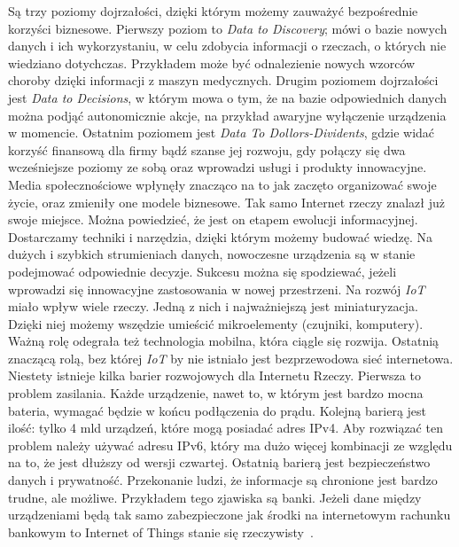 \documentclass[brudnopis]{xmgr}
\begin{document}
Są trzy poziomy dojrzałości, dzięki którym możemy zauważyć bezpośrednie korzyści biznesowe.
Pierwszy poziom to \emph{Data to Discovery}; mówi o bazie nowych danych i ich wykorzystaniu, w celu zdobycia informacji o rzeczach, o których nie wiedziano dotychczas. Przykładem może być odnalezienie nowych wzorców choroby dzięki informacji z maszyn medycznych. 
Drugim poziomem dojrzałości jest \emph{Data to Decisions}, w którym mowa o tym, że na bazie odpowiednich danych można podjąć autonomicznie akcje, na przykład awaryjne wyłączenie urządzenia w momencie.
Ostatnim poziomem jest \emph{Data To Dollors-Dividents}, gdzie widać korzyść finansową dla firmy bądź szanse jej rozwoju, gdy połączy się dwa wcześniejsze poziomy ze sobą oraz wprowadzi usługi i produkty innowacyjne. 
Media społecznościowe wpłynęły znacząco na to jak zaczęto organizować swoje życie, oraz zmieniły one modele biznesowe. Tak samo Internet rzeczy znalazł już swoje miejsce. Można powiedzieć, że jest on etapem ewolucji informacyjnej. Dostarczamy techniki i narzędzia, dzięki którym możemy budować wiedzę. Na dużych i szybkich strumieniach danych, nowoczesne urządzenia są w stanie podejmować odpowiednie decyzje. Sukcesu można się spodziewać, jeżeli wprowadzi się innowacyjne zastosowania w nowej przestrzeni. 
Na rozwój \emph{IoT} miało wpływ wiele rzeczy. Jedną z nich i najważniejszą jest miniaturyzacja. Dzięki niej możemy wszędzie umieścić mikroelementy (czujniki, komputery). Ważną rolę odegrała też technologia mobilna, która ciągle się rozwija. Ostatnią znaczącą rolą, bez której \emph{IoT} by nie istniało jest bezprzewodowa sieć internetowa. 
Niestety istnieje kilka barier rozwojowych dla Internetu Rzeczy. Pierwsza to problem zasilania. Każde urządzenie, nawet to, w którym jest bardzo mocna bateria, wymagać będzie w końcu podłączenia do prądu. Kolejną barierą jest ilość: tylko 4 mld urządzeń, które mogą posiadać adres IPv4. Aby rozwiązać ten problem należy używać adresu IPv6, który ma dużo więcej kombinacji ze względu na to, że jest dłuższy od wersji czwartej. Ostatnią barierą jest bezpieczeństwo danych i prywatność. Przekonanie ludzi, że informacje są chronione jest bardzo trudne, ale możliwe. Przykładem tego zjawiska są banki. Jeżeli dane między urządzeniami będą tak samo zabezpieczone jak środki na internetowym rachunku bankowym to Internet of Things stanie się rzeczywisty~\cite{KeyApplications}.
\end{document}
